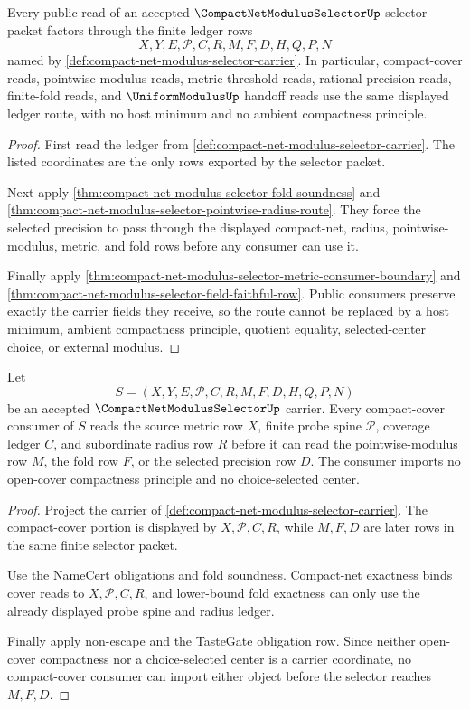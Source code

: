 \begin{theorem}
\label{thm:compact-net-modulus-selector-ledger-route-exactness}
Every public read of an accepted $\CompactNetModulusSelectorUp$ selector packet factors through the finite ledger rows
$$
X,Y,E,\mathcal{P},C,R,M,F,D,H,Q,P,N
$$
named by \autoref{def:compact-net-modulus-selector-carrier}. In particular, compact-cover reads, pointwise-modulus reads, metric-threshold reads, rational-precision reads, finite-fold reads, and $\UniformModulusUp$ handoff reads use the same displayed ledger route, with no host minimum and no ambient compactness principle.
\end{theorem}
\begin{proof}
First read the ledger from \autoref{def:compact-net-modulus-selector-carrier}. The listed coordinates are the only rows exported by the selector packet.

Next apply \autoref{thm:compact-net-modulus-selector-fold-soundness} and \autoref{thm:compact-net-modulus-selector-pointwise-radius-route}. They force the selected precision to pass through the displayed compact-net, radius, pointwise-modulus, metric, and fold rows before any consumer can use it.

Finally apply \autoref{thm:compact-net-modulus-selector-metric-consumer-boundary} and \autoref{thm:compact-net-modulus-selector-field-faithful-row}. Public consumers preserve exactly the carrier fields they receive, so the route cannot be replaced by a host minimum, ambient compactness principle, quotient equality, selected-center choice, or external modulus.
\end{proof}

\begin{theorem}
\label{thm:compact-net-modulus-selector-compact-cover-consumer-lock}
Let
$$
S=(X,Y,E,\mathcal{P},C,R,M,F,D,H,Q,P,N)
$$
be an accepted $\CompactNetModulusSelectorUp$ carrier. Every compact-cover consumer of $S$ reads the source metric row $X$, finite probe spine $\mathcal{P}$, coverage ledger $C$, and subordinate radius row $R$ before it can read the pointwise-modulus row $M$, the fold row $F$, or the selected precision row $D$. The consumer imports no open-cover compactness principle and no choice-selected center.
\end{theorem}
\begin{proof}
Project the carrier of \autoref{def:compact-net-modulus-selector-carrier}. The compact-cover portion is displayed by $X,\mathcal{P},C,R$, while $M,F,D$ are later rows in the same finite selector packet.

Use the NameCert obligations and fold soundness. Compact-net exactness binds cover reads to $X,\mathcal{P},C,R$, and lower-bound fold exactness can only use the already displayed probe spine and radius ledger.

Finally apply non-escape and the TasteGate obligation row. Since neither open-cover compactness nor a choice-selected center is a carrier coordinate, no compact-cover consumer can import either object before the selector reaches $M,F,D$.
\end{proof}

